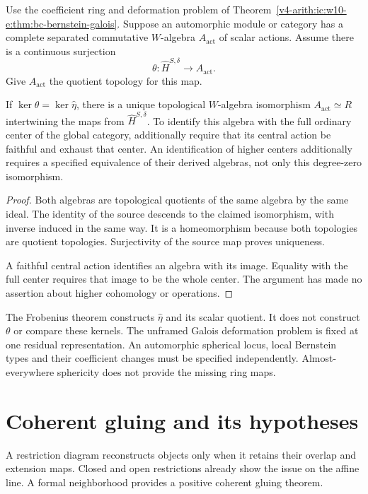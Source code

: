 \begin{proposition}
\label{v4-arith:ic:w10-e:thm:bcglue-glue}
Use the coefficient ring and deformation problem of
Theorem~\ref{v4-arith:ic:w10-e:thm:bc-bernstein-galois}.
Suppose an automorphic module or category has a complete separated
commutative $W$-algebra $A_{\mathrm{act}}$ of scalar actions.
Assume there is a continuous surjection
\[
 \theta:\widehat H^{S,\delta}\longrightarrow A_{\mathrm{act}}.
\]
Give $A_{\mathrm{act}}$ the quotient topology for this map.

If
$\ker\theta=\ker\widehat\eta$, there is a unique topological
$W$-algebra isomorphism $A_{\mathrm{act}}\simeq R$ intertwining the
maps from $\widehat H^{S,\delta}$.
To identify this algebra with the full ordinary center of the global
category, additionally require that its central action be faithful and
exhaust that center. An identification of higher centers additionally
requires a specified equivalence of their derived algebras, not only
this degree-zero isomorphism.
\end{proposition}
\begin{proof}
Both algebras are topological quotients of the same algebra by the
same ideal. The identity of the source descends to the claimed
isomorphism, with inverse induced in the same way. It is a homeomorphism
because both topologies are quotient topologies. Surjectivity of the
source map proves uniqueness.

A faithful central action identifies an
algebra with its image. Equality with the full center requires that
image to be the whole center. The argument has made no assertion about
higher cohomology or operations.
\end{proof}

The Frobenius theorem constructs $\widehat\eta$ and its scalar quotient.
It does not construct $\theta$ or compare these kernels. The unframed
Galois deformation problem is fixed at one residual representation.
An automorphic spherical locus, local Bernstein types and their
coefficient changes must be specified independently. Almost-everywhere
sphericity does not provide the missing ring maps.

\section{Coherent gluing and its hypotheses}
\label{v4-arith:ic:descent}

A restriction diagram reconstructs objects only when it retains
their overlap and extension maps. Closed and open restrictions
already show the issue on the affine line. A formal neighborhood
provides a positive coherent gluing theorem.

